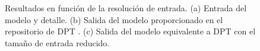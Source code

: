 \begin{figure}[!ht]
\hspace{-3mm}
       
\caption{Resultados en función de la resolución de entrada. (a) Entrada del modelo y detalle. (b) Salida del modelo proporcionado en el repositorio de DPT \cite{visiontransformersDPT}. (c) Salida del modelo equivalente a DPT con el tamaño de entrada reducido.}
    \label{fig:cualitativa-1}
    \end{figure}
\captionsetup[subfigure]{labelformat=parens}













